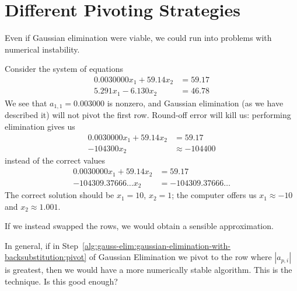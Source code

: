 \section{Different Pivoting Strategies}

Even if Gaussian elimination were viable, we could run into problems
with numerical instability.

\begin{example}
Consider the system of equations
\begin{subequations}\label{eq:gaussian-elim:motivation-for-partial-pivot}
\begin{align}
0.0030000x_{1} + 59.14 x_{2} &= 59.17\\
5.291x_{1} - 6.130 x_{2} &= 46.78
\end{align}
\end{subequations}
We see that $a_{1,1}=0.003000$ is nonzero, and Gaussian elimination (as
we have described it) will not pivot the first row. Round-off error will
kill us: performing elimination gives us
\begin{subequations}
\begin{align}
0.0030000x_{1} + 59.14 x_{2} &= 59.17\\
 -104300x_{2} &\approx -104400
\end{align}
\end{subequations}
instead of the correct values
\begin{subequations}
\begin{align}
0.0030000x_{1} + 59.14 x_{2} &= 59.17\\
 -104309.37666\dots x_{2} &=-104309.37666\dots
\end{align}
\end{subequations}
The correct solution should be $x_{1}=10$, $x_{2}=1$; the computer
offers us $x_{1}\approx-10$ and $x_{2}\approx1.001$.
\end{example}

If we instead swapped the rows, we would obtain a sensible
approximation.

In general, if in
Step~\ref{alg:gauss-elim:gaussian-elimination-with-backsubstitution:pivot}
of Gaussian Elimination we pivot to the row where $|a_{p,i}|$ is greatest, 
then we would have a more numerically stable algorithm. This is the
 technique. Is this good enough?

